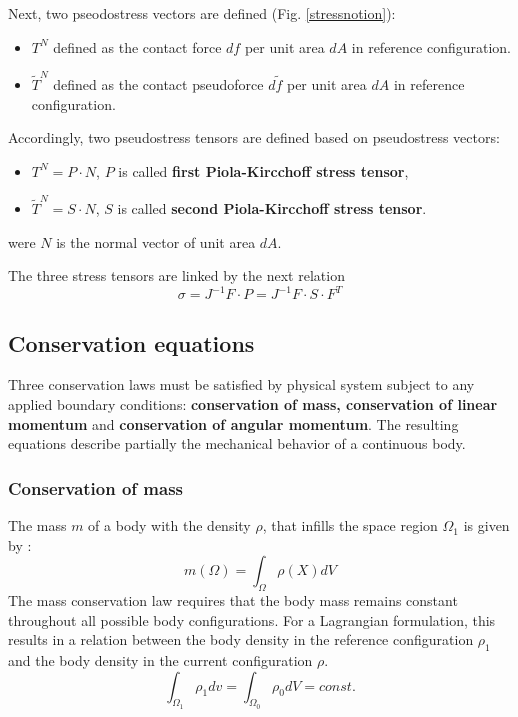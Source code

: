 Next, two pseodostress vectors are defined (Fig. \ref{stressnotion}):
\begin{itemize}
\item $T^N$ defined as the contact force $df$ per unit area $dA$ in reference configuration.
\item $\tilde{T}^N$ defined as the contact pseudoforce $d\tilde{f}$ per unit area $dA$ in reference configuration.  
\end{itemize}


Accordingly, two pseudostress tensors are defined based on pseudostress vectors:
\begin{itemize}
\item $T^N = P \cdot N$, $P$ is called \textbf{first Piola-Kircchoff stress tensor},
\item  $\tilde{T}^N = S \cdot N $, $S$ is called \textbf{second Piola-Kircchoff stress tensor}. 
\end{itemize} 
were $N$ is the normal vector of unit area $dA$.

The three stress tensors are linked by the next relation 
\begin{equation}
\sigma = J^{-1}F \cdot P = J^{-1} F \cdot S \cdot F^T
\label{PK12}
\end{equation}
\subsection{Conservation equations}\label{subsection:conservationequations}
Three conservation laws must be satisfied by physical system subject to any applied boundary conditions: \textbf{conservation of mass, conservation of linear momentum} and \textbf{conservation of angular momentum}. The resulting equations describe partially the mechanical behavior of a continuous body.

\subsubsection*{ Conservation of mass}
The mass $m$ of a body with the density $\rho$, that infills the space region $\Omega_1$ is given by :
\begin{equation}
m(\Omega) = \int_{\Omega} \rho(X)dV
\end{equation}
The mass conservation law requires that the body mass remains constant throughout all possible body configurations. For a Lagrangian formulation, this results in a relation between the body density in the reference configuration $\rho_1$ and the body density in the current configuration $\rho$.
$$\int_{\Omega_1} \rho_1 dv = \int_{\Omega_0} \rho_0 dV = const. $$

